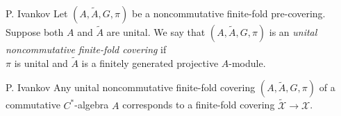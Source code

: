 \documentclass{beamer}
\theoremstyle{plain}
\begin{document}
\begin{frame}
\begin{definition}
	\alert{P. Ivankov}
	  	Let $\left(A, \widetilde{A}, G, \pi \right)$ be a  noncommutative finite-fold  pre-covering. Suppose both $A$ and  $\widetilde{A}$ are unital. We say that $\left(A, \widetilde{A}, G, \pi \right)$ is an \textit{unital noncommutative finite-fold  covering} if \\ $\pi$ is unital and $\widetilde{A}$ is a finitely generated projective  $A$-module.
\end{definition}
\begin{corollary}\alert{P. Ivankov}
	Any unital noncommutative finite-fold  covering $\left(A, \widetilde{A}, G, \pi \right)$ of a commutative $C^*$-algebra $A$ corresponds to a finite-fold covering $ \widetilde{\mathcal  X}\to \mathcal  X$.
\end{corollary}
\end{frame}
\end{document}
